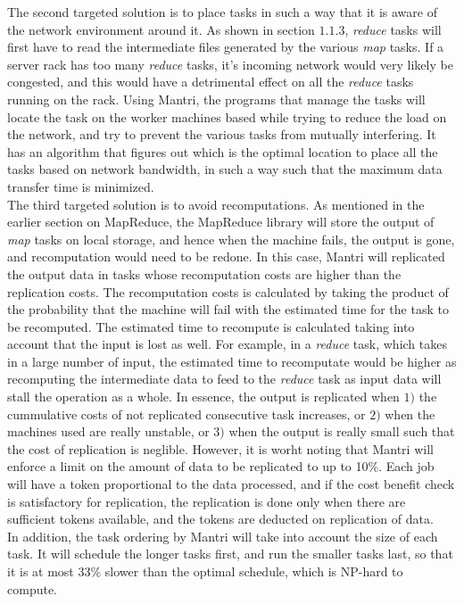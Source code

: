 \documentclass[]{article}
\begin{document}
The second targeted solution is to place tasks in such a way that it is aware of the network environment around it. As shown in section $1.1.3$, \emph{reduce} tasks will first have to read the intermediate files generated by the various \emph{map} tasks. If a server rack has too many \emph{reduce} tasks, it's incoming network would very likely be congested, and this would have a detrimental effect on all the \emph{reduce} tasks running on the rack. Using Mantri, the programs that manage the tasks will locate the task on the worker machines based while trying to reduce the load on the network, and try to prevent the various tasks from mutually interfering. It has an algorithm that figures out which is the optimal location to place all the tasks based on network bandwidth, in such a way such that the maximum data transfer time is minimized.\\

The third targeted solution is to avoid recomputations. As mentioned in the earlier section on MapReduce, the MapReduce library will store the output of \emph{map} tasks on local storage, and hence when the machine fails, the output is gone, and recomputation would need to be redone. In this case, Mantri will replicated the output data in tasks whose recomputation costs are higher than the replication costs. The recomputation costs is calculated by taking the product of the probability that the machine will fail with the estimated time for the task to be recomputed. The estimated time to recompute is calculated taking into account that the input is lost as well. For example, in a \emph{reduce} task, which takes in a large number of input, the estimated time to recomputate would be higher as recomputing the intermediate data to feed to the \emph{reduce} task as input data will stall the operation as a whole. In essence, the output is replicated when $1)$ the cummulative costs of not replicated consecutive task increases, or $2)$ when the machines used are really unstable, or $3)$ when the output is really small such that the cost of replication is neglible. However, it is worht noting that Mantri will enforce a limit on the amount of data to be replicated to up to 10\%. Each job will have a token proportional to the data processed, and if the cost benefit check is satisfactory for replication, the replication is done only when there are sufficient tokens available, and the tokens are deducted on replication of data.\\

In addition, the task ordering by Mantri will take into account the size of each task. It will schedule the longer tasks first, and run the smaller tasks last, so that it is at most 33\% slower than the optimal schedule, which is NP-hard to compute.\\
\end{document}
